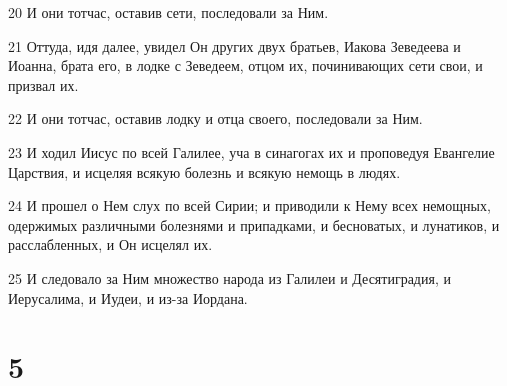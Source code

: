 \par 20 И они тотчас, оставив сети, последовали за Ним.
\par 21 Оттуда, идя далее, увидел Он других двух братьев, Иакова Зеведеева и Иоанна, брата его, в лодке с Зеведеем, отцом их, починивающих сети свои, и призвал их.
\par 22 И они тотчас, оставив лодку и отца своего, последовали за Ним.
\par 23 И ходил Иисус по всей Галилее, уча в синагогах их и проповедуя Евангелие Царствия, и исцеляя всякую болезнь и всякую немощь в людях.
\par 24 И прошел о Нем слух по всей Сирии; и приводили к Нему всех немощных, одержимых различными болезнями и припадками, и бесноватых, и лунатиков, и расслабленных, и Он исцелял их.
\par 25 И следовало за Ним множество народа из Галилеи и Десятиградия, и Иерусалима, и Иудеи, и из-за Иордана.

\chapter{5}

